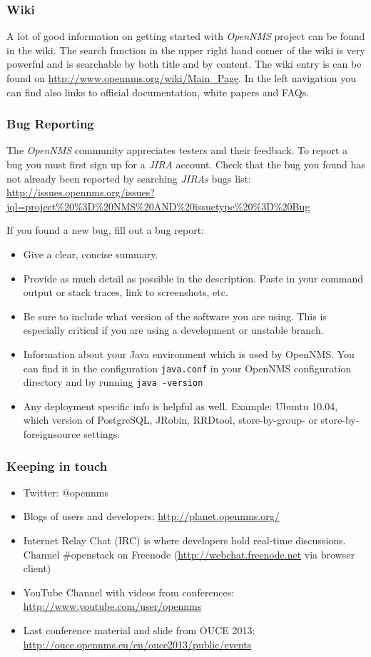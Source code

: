 \subsubsection{Wiki}
A lot of good information on getting started with \emph{OpenNMS} project can be found in the wiki. The search function in the upper right hand corner of the wiki is very powerful and is searchable by both title and by content. The wiki entry is can be found on \url{http://www.opennms.org/wiki/Main_Page}. In the left navigation you can find also links to official documentation, white papers and FAQs.

\subsubsection{Bug Reporting}
The \emph{OpenNMS} community appreciates testers and their feedback. To report a bug you must first sign up for a \emph{JIRA} account.
Check that the bug you found has not already been reported by searching \emph{JIRAs} bugs list: \url{http://issues.opennms.org/issues?jql=project%20%3D%20NMS%20AND%20issuetype%20%3D%20Bug}

If you found a new bug, fill out a bug report:
\begin{itemize}
  \item Give a clear, concise summary.
  \item Provide as much detail as possible in the description. Paste in your command output or stack traces, link to screenshots, etc.
  \item Be sure to include what version of the software you are using. This is especially critical if you are using a development or unstable branch.
  \item Information about your Java environment which is used by OpenNMS. You can find it in the configuration \texttt{java.conf} in your OpenNMS configuration directory and by running \texttt{java -version} 
  \item Any deployment specific info is helpful as well. Example: Ubuntu 10.04, which version of PostgreSQL, JRobin, RRDtool, store-by-group- or store-by-foreignsource settings.
\end{itemize}

\subsubsection{Keeping in touch}
\begin{itemize}
  \item Twitter: @opennms
  \item Blogs of users and developers: \url{http://planet.opennms.org/}
  \item Internet Relay Chat (IRC) is where developers hold real-time discussions. Channel \#openstack on Freenode (\url{http://webchat.freenode.net} via browser client)
  \item YouTube Channel with videos from conferences:\\
  \url{http://www.youtube.com/user/opennms}
  \item Last conference material and slide from OUCE 2013:\\
  \url{http://ouce.opennms.eu/en/ouce2013/public/events}
\end{itemize}

